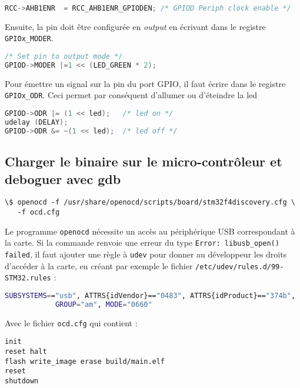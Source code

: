 \documentclass[12pt]{article}
\begin{document}
\begin{lstlisting}[language=C]
RCC->AHB1ENR  = RCC_AHB1ENR_GPIODEN; /* GPIOD Periph clock enable */
\end{lstlisting}

Ensuite, la pin doit être configurée en \emph{output} en écrivant dans le registre \texttt{GPIOx\_MODER}. 

\begin{lstlisting}[language=C]
/* Set pin to output mode */
GPIOD->MODER |=1 << (LED_GREEN * 2);
\end{lstlisting}

Pour émettre un signal sur la pin du port GPIO, il faut écrire dans le registre \texttt{GPIOx\_ODR}.
Ceci permet par conséquent d'allumer ou d'éteindre la led

\begin{lstlisting}[language=C]
GPIOD->ODR |= (1 << led);   /* led on */
udelay (DELAY);
GPIOD->ODR &= ~(1 << led);  /* led off */
\end{lstlisting}

\subsection{Charger le binaire sur le micro-contrôleur et deboguer avec gdb}

\begin{lstlisting}
\$ openocd -f /usr/share/openocd/scripts/board/stm32f4discovery.cfg \
   -f ocd.cfg
\end{lstlisting}

Le programme \texttt{openocd} nécessite un accès au périphérique USB correspondant à la carte. Si la commande renvoie une erreur du type \texttt{Error: libusb\_open() failed}, il faut ajouter une règle à \texttt{udev} pour donner au développeur les droits d'accéder à la carte, en créant par exemple le fichier \texttt{/etc/udev/rules.d/99-STM32.rules} :

  \begin{lstlisting}[language=sh]
SUBSYSTEMS=="usb", ATTRS{idVendor}=="0483", ATTRS{idProduct}=="374b", 
            GROUP="am", MODE="0660"
  \end{lstlisting}

Avec le fichier \texttt{ocd.cfg} qui contient :

\begin{lstlisting}
init
reset halt
flash write_image erase build/main.elf 
reset 
shutdown
\end{lstlisting}
\end{document}
